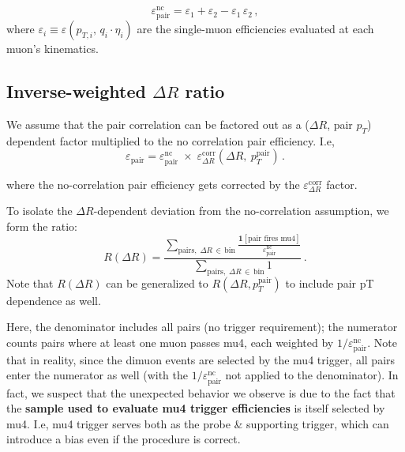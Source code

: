 \documentclass[11pt]{article}
\begin{document}
\begin{equation}\label{Eq: no corr pair effcy}
  \varepsilon_{\text{pair}}^{\text{nc}} = \varepsilon_1 + \varepsilon_2 - \varepsilon_1\,\varepsilon_2\,,
\end{equation}
where $\varepsilon_i \equiv \varepsilon(p_{T,i},\, q_i\!\cdot\!\eta_i)$ are the single-muon efficiencies evaluated at each muon's kinematics.

\subsection*{Inverse-weighted $\Delta R$ ratio}

We assume that the pair correlation can be factored out as a ($\Delta R$, pair $p_{T}$) dependent factor multiplied to the no correlation pair efficiency. I.e,
\begin{equation}
    \varepsilon_{\text{pair}} = \varepsilon_{\text{pair}}^{\text{nc}}\;\times\;\varepsilon_{\Delta R}^{\text{corr}}(\Delta R,\ p_T^{\textrm{pair}})\,.
\end{equation}

where the no-correlation pair efficiency gets corrected by the $\varepsilon_{\Delta R}^{\text{corr}}$ factor.

To isolate the $\Delta R$-dependent deviation from the no-correlation assumption, we form the ratio:
\begin{equation}
  R(\Delta R) = \frac{\displaystyle\sum_{\text{pairs},\;\Delta R\,\in\,\text{bin}}
    \frac{\mathbf{1}[\text{pair fires mu4}]}{\varepsilon_{\text{pair}}^{\text{nc}}}}
    {\displaystyle\sum_{\text{pairs},\;\Delta R\,\in\,\text{bin}} 1}\,.
\end{equation}
Note that $ R(\Delta R)$ can be generalized to $ R(\Delta R, p_T^{\text{pair}})$ to include pair pT dependence as well.

Here, the denominator includes all pairs (no trigger requirement); the numerator counts pairs where at least one muon passes mu4, each weighted by $1/\varepsilon_{\text{pair}}^{\text{nc}}$. {\color{blue}Note that in reality, since the dimuon events are selected by the mu4 trigger, all pairs enter the numerator as well (with the $1/\varepsilon_{\text{pair}}^{\text{nc}}$ not applied to the denominator). In fact, we suspect that the unexpected behavior we observe is due to the fact that the \textbf{sample used to evaluate mu4 trigger efficiencies} is itself selected by mu4. I.e, mu4 trigger serves both as the probe \& supporting trigger, which can introduce a bias even if the procedure is correct.}
\end{document}
